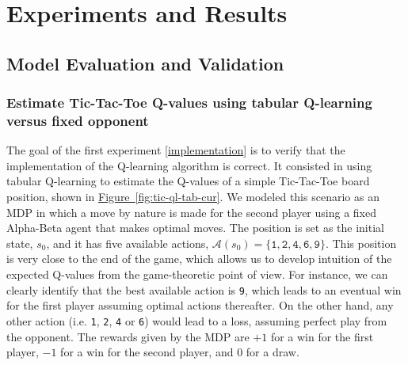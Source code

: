 \documentclass{article}
\newcommand{\GithubURL}[1]{[\href{https://github.com/davidrobles/mlnd-capstone-code/blob/master/#1}{implementation}]}
\begin{document}
\section{Experiments and Results}

\subsection{Model Evaluation and Validation}

\subsubsection{Estimate Tic-Tac-Toe Q-values using tabular Q-learning versus fixed opponent}
\label{sec:tic-ql-tab-simple-fixed}


The goal of the first experiment \GithubURL{experiments/tic_ql_tab_simple.py} is to verify that the
implementation of the Q-learning algorithm is correct. It consisted in using tabular Q-learning to
estimate the Q-values of a simple Tic-Tac-Toe board position, shown in \hyperref[fig:tic-ql-tab-cur]
{Figure~\ref*{fig:tic-ql-tab-cur}}. We modeled this scenario as an MDP in which a move by nature is
made for the second player using a fixed Alpha-Beta agent that makes optimal moves. The position is
set as the initial state, $s_0$, and it has five available actions, $\mathcal{A}(s_0) =
\{\texttt{1}, \texttt{2}, \texttt{4}, \texttt{6}, \texttt{9}\}$. This position is very close to the
end of the game, which allows us to develop intuition of the expected Q-values from the
game-theoretic point of view. For instance, we can clearly identify that the best available action
is \texttt{9}, which leads to an eventual win for the first player assuming optimal actions
thereafter. On the other hand, any other action (i.e.  \texttt{1}, \texttt{2}, \texttt{4} or
\texttt{6}) would lead to a loss, assuming perfect play from the opponent.  The rewards given by the
MDP are $+1$ for a win for the first player, $-1$ for a win for the second player, and $0$ for a
draw.

\end{document}
